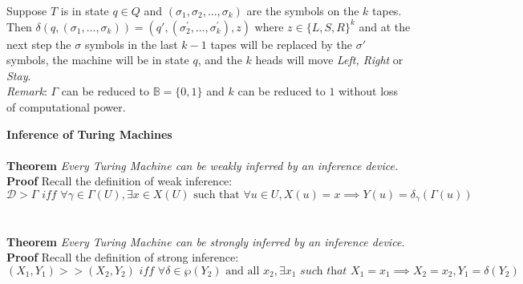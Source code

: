 \documentclass[11pt]{article}
\newcommand{\B}{\mathbb{B}}
\begin{document}
Suppose $ T $ is in state $ q \in Q $ and $ (\sigma_1, \sigma_2, \dots, \sigma_k) $ are the symbols on the $ k $ tapes. Then $ \delta(q, (\sigma_1, \dots, \sigma_k)) = (q', (\sigma_{2}^{'}, \dots, \sigma_{k}^{'}), z) $ where $ z \in \{L, S, R\}^k $ and at the next step the $ \sigma $ symbols in the last $ k - 1 $ tapes will be replaced by the $ \sigma' $ symbols, the machine will be in state $ q $, and the $ k $ heads will move \textit{Left, Right} or \textit{Stay}. \\

\textit{Remark}: $\Gamma$ can be reduced to $ \B = \{0, 1\} $ and $ k $ can be reduced to $ 1 $ without loss of computational power.




 



\pagebreak


\textbf{Inference of Turing Machines} \\
\\
\textbf{Theorem} \quad \textit{Every Turing Machine can be weakly inferred by an inference device.}\\
\textbf{Proof} \quad Recall the definition of weak inference: $$ \mathcal{D} > \Gamma \textit{ iff } \forall \gamma \in \Gamma(U), \exists x \in X(U) \text{ such that } \forall u \in U, X(u) = x \implies Y(u) = \delta_{\gamma}(\Gamma(u)) $$ \\
\\
\textbf{Theorem} \quad \textit{Every Turing Machine can be strongly inferred by an inference device.} \\
\textbf{Proof} \quad Recall the definition of strong inference:
$$ (X_1, Y_1) >> (X_2, Y_2) \textit{ iff } \forall \delta \in \wp(Y_2)\text{ and all } x_2,  \exists x_1 \textit{ such that } X_1 = x_1 \implies X_2 = x_2, Y_1 = \delta(Y_2) $$




\end{document}
